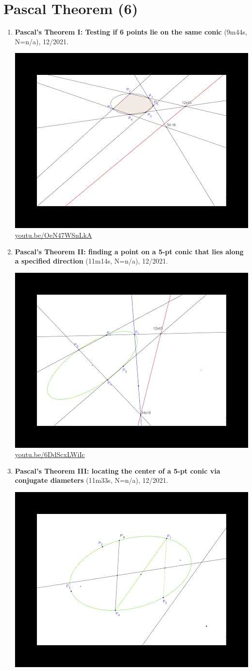 \documentclass[12pt]{amsart}
\begin{document}
\section{Pascal Theorem (6)}

\begin{enumerate}[resume]
\item \textbf{Pascal's Theorem I: Testing if 6 points lie on the same conic} (9m44s, N=n/a), 12/2021. 
\begin{center}\includegraphics[width=.5\textwidth]{pics/OeN47WSnLkA.jpg} \\ 
\href{https://youtu.be/OeN47WSnLkA}{\url{youtu.be/OeN47WSnLkA}}\end{center}
% 
\item \textbf{Pascal's Theorem II: finding a point on a 5-pt conic that lies along a specified direction} (11m14s, N=n/a), 12/2021. 
\begin{center}\includegraphics[width=.5\textwidth]{pics/6DdScxLWiIc.jpg} \\ 
\href{https://youtu.be/6DdScxLWiIc}{\url{youtu.be/6DdScxLWiIc}}\end{center}
% 
\item \textbf{Pascal's Theorem III: locating the center of a 5-pt conic via conjugate diameters} (11m33s, N=n/a), 12/2021. 
\begin{center}\includegraphics[width=.5\textwidth]{pics/t8B6jEJ4DbU.jpg} \\ 

\end{center}
\end{enumerate}
\end{document}
